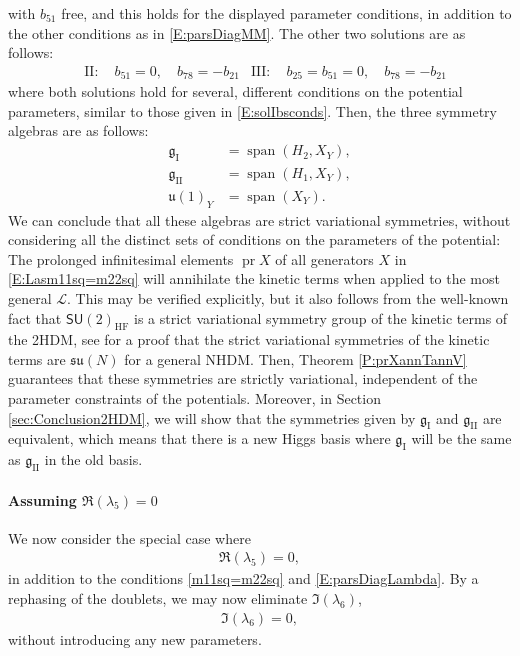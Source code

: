 \documentclass[a4paper,hidelinks, 12pt]{article}
\numberwithin{equation}{section}
\theoremstyle{plain}
\newcommand{\La}{\mathfrak}
\newcommand{\Lg}{\mathsf}
\newcommand{\mc}{\mathcal}
\newcommand{\on}{\operatorname}
\begin{document}
with $b_{51}$ free, and this holds for the displayed parameter conditions, in addition to the other conditions as in \eqref{E:parsDiagMM}.
The other two solutions are as follows:
\begin{align}
&\text{II}:\quad	b_{51}=0, \quad b_{78}=-b_{21}
&\text{III}:\quad	b_{25}=b_{51}=0, \quad b_{78}=-b_{21}
\end{align}
 where both solutions hold for several, different conditions on the potential parameters, similar to those given in \eqref{E:solIbsconds}.
	Then, the three symmetry algebras are as follows:
	\begin{align}\label{E:Lasm11sq=m22sq}
		\La{g}_\text{I} &= \on{span}(H_2,X_Y), \\
		\La{g}_\text{II} &= \on{span}(H_1,X_Y),  \\
		\La{u}(1)_Y &= \on{span}(X_Y).
	\end{align}
  We can conclude that all these algebras are strict variational symmetries, without considering all the distinct sets of conditions on the parameters of the potential: 
 The prolonged infinitesimal elements $\on{pr}X$ of all generators $X$ in \eqref{E:Lasm11sq=m22sq} will annihilate
the kinetic terms when applied to the most general $\mc{L}$. This may be verified explicitly, but it also follows from the well-known fact that $\Lg{SU}(2)_\text{HF}$ is a strict variational symmetry group of the kinetic terms of the 2HDM, see \cite{Olaussen:2010aq} for a proof that
the strict variational symmetries of the kinetic terms are $\La{su}(N)$ for a general NHDM. Then, Theorem \ref{P:prXannTannV}
guarantees that these symmetries are strictly variational, independent of the parameter constraints of the potentials.
Moreover, in Section \ref{sec:Conclusion2HDM}, we will show that the symmetries given by $\La{g}_\text{I}$ and $\La{g}_\text{II}$ are equivalent, which means that there is a new Higgs basis where $\La{g}_\text{I}$ will be the same as $\La{g}_\text{II}$ in the old basis.


\paragraph{Assuming $\Re(\lambda_5)= 0$}
\label{sec:AssumingReLambda50}
We now consider the special case where
\begin{align}\label{E:Rel5=02HDM}
	\Re(\lambda_5)= 0,
\end{align}
in addition to the conditions \eqref{m11sq=m22sq} and \eqref{E:parsDiagLambda}.
By a rephasing of the doublets, we may now eliminate $\Im(\lambda_6)$,
 \begin{align}\label{E:Iml6=02HDM}
	\Im(\lambda_6)= 0,
\end{align}
without introducing any new parameters.
\end{document}
